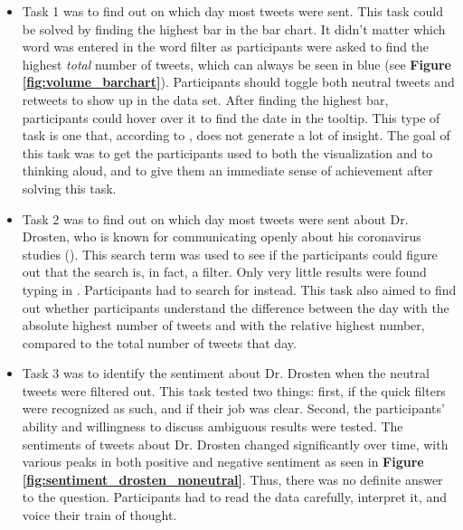 \begin{itemize}
    \item Task 1 was to find out on which day most tweets were sent. This task could be solved by finding the highest bar in the bar chart. It didn't matter which word was entered in the word filter as participants were asked to find the highest \emph{total} number of tweets, which can always be seen in blue (see \textbf{Figure \ref{fig:volume_barchart}}). Participants should toggle both neutral tweets and retweets to show up in the data set. After finding the highest bar, participants could hover over it to find the date in the tooltip. This type of task is one that, according to \citeauthor{northMeasuringVisualizationInsight2006}, does not generate a lot of insight. The goal of this task was to get the participants used to both the visualization and to thinking aloud, and to give them an immediate sense of achievement after solving this task.
    \item Task 2 was to find out on which day most tweets were sent about Dr. Drosten, who is known for communicating openly about his coronavirus studies (\cite{henleyCoronavirusMeetScientists2020}). This search term was used to see if the participants could figure out that the search is, in fact, a filter. Only very little results were found typing in . Participants had to search for  instead. This task also aimed to find out whether participants understand the difference between the day with the absolute highest number of tweets and with the relative highest number, compared to the total number of tweets that day.
    \item Task 3 was to identify the sentiment about Dr. Drosten when the neutral tweets were filtered out. This task tested two things: first, if the quick filters were recognized as such, and if their job was clear. Second, the participants' ability and willingness to discuss ambiguous results were tested. The sentiments of tweets about Dr. Drosten changed significantly over time, with various peaks in both positive and negative sentiment as seen in \textbf{Figure \ref{fig:sentiment_drosten_noneutral}}. Thus, there was no definite answer to the question. Participants had to read the data carefully, interpret it, and voice their train of thought.
    \begin{figure}[htb]

\end{figure}
\end{itemize}
